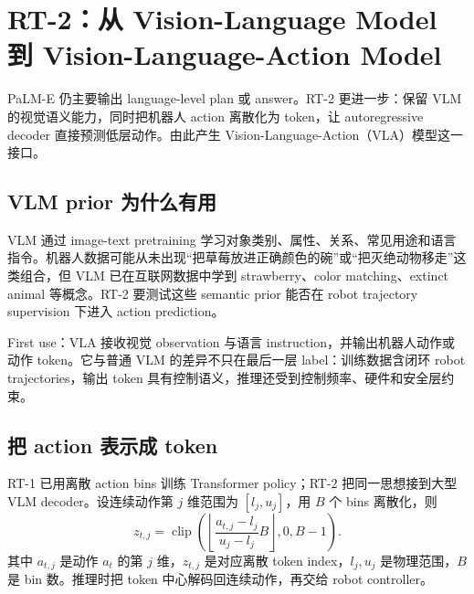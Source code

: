 \section{RT-2：从 Vision-Language Model 到 Vision-Language-Action Model}

PaLM-E 仍主要输出 language-level plan 或 answer。RT-2 更进一步：保留 VLM 的视觉语义能力，同时把机器人 action 离散化为 token，让 autoregressive decoder 直接预测低层动作。由此产生 Vision-Language-Action（VLA）模型这一接口。

\subsection{VLM prior 为什么有用}

VLM 通过 image-text pretraining 学习对象类别、属性、关系、常见用途和语言指令。机器人数据可能从未出现“把草莓放进正确颜色的碗”或“把灭绝动物移走”这类组合，但 VLM 已在互联网数据中学到 strawberry、color matching、extinct animal 等概念。RT-2 要测试这些 semantic prior 能否在 robot trajectory supervision 下进入 action prediction。



\begin{knowledgebox}{First use：VLA}
接收视觉 observation 与语言 instruction，并输出机器人动作或动作 token。它与普通 VLM 的差异不只在最后一层 label：训练数据含闭环 robot trajectories，输出 token 具有控制语义，推理还受到控制频率、硬件和安全层约束。
\end{knowledgebox}

\subsection{把 action 表示成 token}

RT-1 已用离散 action bins 训练 Transformer policy；RT-2 把同一思想接到大型 VLM decoder。设连续动作第 $j$ 维范围为 $[l_j,u_j]$，用 $B$ 个 bins 离散化，则
$$
z_{t,j}=\operatorname{clip}\!\left(
\left\lfloor \frac{a_{t,j}-l_j}{u_j-l_j}B\right\rfloor,0,B-1
\right).
$$
其中 $a_{t,j}$ 是动作 $a_t$ 的第 $j$ 维，$z_{t,j}$ 是对应离散 token index，$l_j,u_j$ 是物理范围，$B$ 是 bin 数。推理时把 token 中心解码回连续动作，再交给 robot controller。

